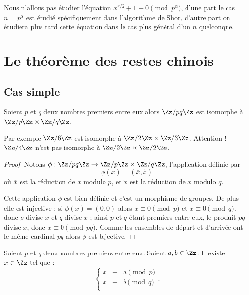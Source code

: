 \documentclass[11pt,class=report,crop=false]{standalone}
\begin{document}
Nous n'allons pas étudier l'équation $x^{r/2}+1\equiv 0 \pmod{p^\alpha}$, d'une part le cas $n=p^\alpha$ est étudié spécifiquement dans l'algorithme de Shor, d'autre part on étudiera plus tard cette équation dans le cas plus général d'un $n$ quelconque.



\section{Le théorème des restes chinois}


\subsection{Cas simple}

\begin{theoreme}
Soient $p$ et $q$ deux nombres premiers entre eux alors
$\Zz/ pq \Zz$ est isomorphe à $\Zz/p\Zz \times \Zz/q\Zz$.
\end{theoreme}

Par exemple $\Zz/ 6 \Zz$ est isomorphe à $\Zz/2\Zz \times \Zz/3\Zz$.
Attention ! $\Zz/ 4 \Zz$ n'est pas isomorphe à $\Zz/2\Zz \times \Zz/2\Zz$.

\begin{proof}
Notons $\phi : \Zz/ pq \Zz \to \Zz/p\Zz \times \Zz/q\Zz$, l'application définie par 
$$\phi(x) = ( \overline{x}, \tilde{x})$$
où $\overline{x}$ est la réduction de $x$ modulo $p$, et $\tilde{x}$ est la réduction de $x$ modulo $q$.

Cette application $\phi$ est bien définie et c'est un morphisme de groupes.
De plus elle est injective : si $\phi(x) = (0,0)$ alors $x \equiv 0 \pmod p$
et $x \equiv 0 \pmod q$, donc $p$ divise $x$ et $q$ divise $x$ ; ainsi $p$ et $q$ étant premiers entre eux, le produit $pq$ divise $x$, donc $x \equiv 0 \pmod{pq}$.
Comme les ensembles de départ et d'arrivée ont le même cardinal $pq$ alors $\phi$ est bijective.
\end{proof}

\begin{corollaire}
Soient $p$ et $q$ deux nombres premiers entre eux.
Soient $a,b \in \Zz$.
Il existe $x \in \Zz$ tel que :
$$\left\{\begin{array}{rcl}
x & \equiv & a \pmod p \\
x & \equiv & b \pmod q \\
\end{array}\right..$$
\end{corollaire}
\end{document}
